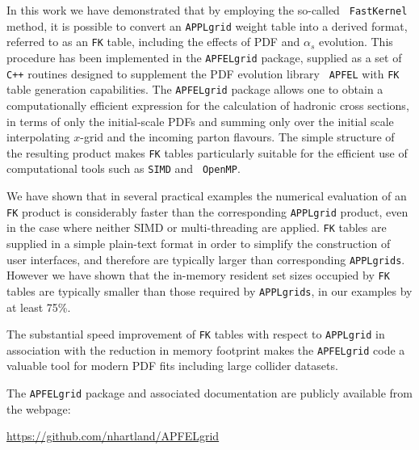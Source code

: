 \documentclass[preprint,12pt]{elsarticle}
\begin{document}
In this work we have demonstrated that by employing the so-called {\tt
  FastKernel} method, it is possible to convert an {\tt APPLgrid}
weight table into a derived format, referred to as an {\tt FK} table,
including the effects of PDF and $\alpha_s$ evolution. This procedure has been
implemented in the {\tt APFELgrid} package, supplied as a set of {\tt
  C++} routines designed to supplement the PDF evolution library {\tt
  APFEL} with {\tt FK} table generation capabilities.
The {\tt APFELgrid} package allows one to obtain a computationally
efficient expression for the calculation of hadronic cross sections,
in terms of only the initial-scale PDFs and summing only over the
initial scale interpolating $x$-grid and the incoming parton
flavours. The simple structure of the resulting
product makes {\tt FK} tables particularly suitable for the
efficient use of computational tools such as {\tt SIMD} and {\tt
  OpenMP}.

We have shown that in several practical examples the numerical
evaluation of an {\tt FK} product is considerably faster than the
corresponding {\tt APPLgrid} product, even in the case where neither
SIMD or multi-threading are applied. {\tt FK} tables are supplied in a
simple plain-text format in order to simplify the construction of user
interfaces, and therefore are typically larger than 
corresponding {\tt APPLgrids}. However we have shown that the
in-memory resident set sizes occupied by {\tt FK} tables are typically
smaller than those required by {\tt APPLgrids}, in our examples by at least 75\%.

The substantial speed improvement of {\tt FK} tables with respect to
{\tt APPLgrid} in association with the reduction in memory footprint
makes the {\tt APFELgrid} code a valuable tool for modern PDF fits
including large collider datasets.

The {\tt APFELgrid} package and associated documentation are publicly
available from the webpage:
\begin{center}
\url{https://github.com/nhartland/APFELgrid}
\end{center}
\end{document}
